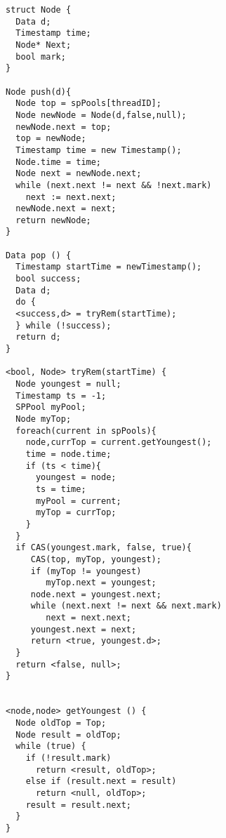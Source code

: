 \begin{lstlisting}
struct Node {
  Data d;
  Timestamp time;
  Node* Next;
  bool mark;
}

Node push(d){
  Node top = spPools[threadID];
  Node newNode = Node(d,false,null);
  newNode.next = top;
  top = newNode;
  Timestamp time = new Timestamp();
  Node.time = time;
  Node next = newNode.next;
  while (next.next != next && !next.mark)
    next := next.next;
  newNode.next = next;
  return newNode;
}	

Data pop () {
  Timestamp startTime = newTimestamp();
  bool success;
  Data d;
  do {
  <success,d> = tryRem(startTime);
  } while (!success);
  return d;
}

<bool, Node> tryRem(startTime) {
  Node youngest = null;
  Timestamp ts = -1;
  SPPool myPool;
  Node myTop;
  foreach(current in spPools){
    node,currTop = current.getYoungest();
    time = node.time;
    if (ts < time){
      youngest = node;
      ts = time;
      myPool = current;
      myTop = currTop;
    }
  }
  if CAS(youngest.mark, false, true){
     CAS(top, myTop, youngest);
     if (myTop != youngest) 
        myTop.next = youngest;
     node.next = youngest.next;
     while (next.next != next && next.mark)
        next = next.next;
     youngest.next = next;
     return <true, youngest.d>;   
  }
  return <false, null>;
}


<node,node> getYoungest () {
  Node oldTop = Top;
  Node result = oldTop;
  while (true) {
    if (!result.mark)
      return <result, oldTop>;
    else if (result.next = result)
      return <null, oldTop>;
    result = result.next;  
  }
}
\end{lstlisting}